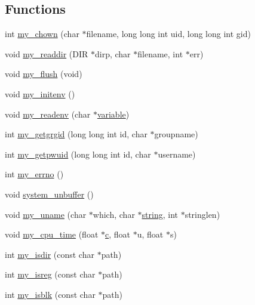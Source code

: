 \subsection*{Functions}
\begin{DoxyCompactItemize}
\item 
int \hyperlink{C-M__system_8c_acfa12de4342c03519fc35d7892db94b2}{my\+\_\+chown} (char $\ast$filename, long long int uid, long long int gid)
\item 
void \hyperlink{C-M__system_8c_a56eb1f4025386fefa96810c8846a75ca}{my\+\_\+readdir} (D\+IR $\ast$dirp, char $\ast$filename, int $\ast$err)
\item 
void \hyperlink{C-M__system_8c_aaf9088f4cc3498dcf1abec624adabe76}{my\+\_\+flush} (void)
\item 
void \hyperlink{C-M__system_8c_ab5188f2ca99719a14c77a1acae06f93a}{my\+\_\+initenv} ()
\item 
void \hyperlink{C-M__system_8c_a0114eece06797ba0c5e6f5948841501a}{my\+\_\+readenv} (char $\ast$\hyperlink{M__stopwatch_83_8txt_a2fa76741434e14a1b61bcbd4629b9cec}{variable})
\item 
int \hyperlink{C-M__system_8c_a13b282e9de0dc0bb29bec1d76aaf6cf0}{my\+\_\+getgrgid} (long long int id, char $\ast$groupname)
\item 
int \hyperlink{C-M__system_8c_a0feb597a044e16699952e0056390f3d6}{my\+\_\+getpwuid} (long long int id, char $\ast$username)
\item 
int \hyperlink{C-M__system_8c_ad9bbaffdef223d18bb59a22c3c599201}{my\+\_\+errno} ()
\item 
void \hyperlink{C-M__system_8c_ab955d6c562df08b9e465fe3cea24d83d}{system\+\_\+unbuffer} ()
\item 
void \hyperlink{C-M__system_8c_ab341d42a9117c4bd188dcdcbff69fe9a}{my\+\_\+uname} (char $\ast$which, char $\ast$\hyperlink{what__overview_81_8txt_a7d189cc480786c3c65688ced463aedcb}{string}, int $\ast$stringlen)
\item 
void \hyperlink{C-M__system_8c_aae18c27a21f7c4aed7328460a7edb34c}{my\+\_\+cpu\+\_\+time} (float $\ast$\hyperlink{c_8f90_aeb1f4e639be0213b4cbd07f2583a5b1f}{c}, float $\ast$u, float $\ast$s)
\item 
int \hyperlink{C-M__system_8c_a4d9118bb9590e12ac1956789cd08e09b}{my\+\_\+isdir} (const char $\ast$path)
\item 
int \hyperlink{C-M__system_8c_afec6872f4aa34aba9e71a18324d53bce}{my\+\_\+isreg} (const char $\ast$path)
\item 
int \hyperlink{C-M__system_8c_ad07b549d969a0670b0b8f7c6bef83e92}{my\+\_\+isblk} (const char $\ast$path)

\end{DoxyCompactItemize}
